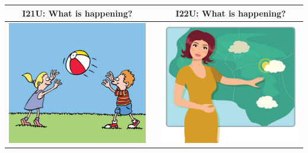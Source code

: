 \documentclass[12pt,notitlepage]{article}
\begin{document}
\begin{center}
\begin{tabular}{|c|c|c|}
\hline
I21U: What is happening? && I22U: What is happening? \\
\hline
\includegraphics[width=20em,trim=0 0 0 -3]{figures/I21.jpg} & & \includegraphics[width=20em,trim=0 0 0 -3]{figures/I22.jpg} \\
\hline
\end{tabular}
\vspace{1em} \\



\end{center}
\end{document}
